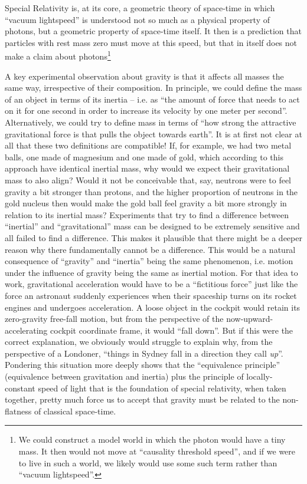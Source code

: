 \documentclass[twocolumn]{article}
\begin{document}
Special Relativity is, at its core, a geometric theory of space-time
in which ``vacuum lightspeed'' is understood not so much as a physical
property of photons, but a geometric property of space-time itself. It
then is a prediction that particles with rest mass zero must move at
this speed, but that in itself does not make a claim about
photons\footnote{We could construct a model world in which the photon
would have a tiny mass. It then would not move at ``causality
threshold speed'', and if we were to live in such a world, we likely
would use some such term rather than ``vacuum lightspeed''.}

A key experimental observation about gravity is that it affects all
masses the same way, irrespective of their composition. In principle,
we could define the mass of an object in terms of its inertia --
i.e. as ``the amount of force that needs to act on it for one second
in order to increase its velocity by one meter per second''.
Alternatively, we could try to define mass in terms of ``how strong
the attractive gravitational force is that pulls the object towards
earth''. It is at first not clear at all that these two definitions
are compatible! If, for example, we had two metal balls, one made of
magnesium and one made of gold, which according to this approach have
identical inertial mass, why would we expect their gravitational mass
to also align? Would it not be conceivable that, say, neutrons were to
feel gravity a bit stronger than protons, and the higher proportion of
neutrons in the gold nucleus then would make the gold ball feel
gravity a bit more strongly in relation to its inertial mass?
Experiments that try to find a difference between ``inertial'' and
``gravitational'' mass can be designed to be extremely sensitive and
all failed to find a difference. This makes it plausible that there
might be a deeper reason why there fundamentally cannot be a
difference. This would be a natural consequence of ``gravity'' and
``inertia'' being the same phenomenon, i.e. motion under the influence
of gravity being the same as inertial motion. For that idea to work,
gravitational acceleration would have to be a ``fictitious force''
just like the force an astronaut suddenly experiences when their
spaceship turns on its rocket engines and undergoes acceleration. A
loose object in the cockpit would retain its zero-gravity free-fall
motion, but from the perspective of the now-upward-accelerating
cockpit coordinate frame, it would ``fall down''. But if this were the
correct explanation, we obviously would struggle to explain why, from
the perspective of a Londoner, ``things in Sydney fall in a direction
they call \emph{up}''. Pondering this situation more deeply shows that
the ``equivalence principle'' (equivalence between gravitation and
inertia) plus the principle of locally-constant speed of light that is
the foundation of special relativity, when taken together, pretty much
force us to accept that gravity must be related to the non-flatness of
classical space-time.
\end{document}
